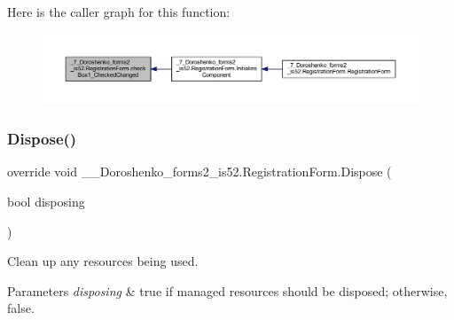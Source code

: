 Here is the caller graph for this function\+:
\nopagebreak
\begin{figure}[H]
\begin{center}
\leavevmode
\includegraphics[width=350pt]{class__7___doroshenko__forms2__is52_1_1_registration_form_ab5089f0bb46579d23942b19d4bbcd542_icgraph}
\end{center}
\end{figure}
\hypertarget{class__7___doroshenko__forms2__is52_1_1_registration_form_a9d9116080a88f2a3a51d7a0ee3c08d69}{}\label{class__7___doroshenko__forms2__is52_1_1_registration_form_a9d9116080a88f2a3a51d7a0ee3c08d69} 
\subsubsection{\texorpdfstring{Dispose()}{Dispose()}}
{\footnotesize\ttfamily override void \+\_\+\_\+\+Doroshenko\+\_\+forms2\+\_\+is52.\+Registration\+Form.\+Dispose (\begin{DoxyParamCaption}\item[{bool}]{disposing }\end{DoxyParamCaption})\hspace{0.3cm}{\ttfamily [protected]}}



Clean up any resources being used. 


\begin{DoxyParams}{Parameters}
{\em disposing} & true if managed resources should be disposed; otherwise, false.\\
\hline
\end{DoxyParams}
\hypertarget{class__7___doroshenko__forms2__is52_1_1_registration_form_a0fe750fb526e69ebe4b83165857d91bf}{}\label{class__7___doroshenko__forms2__is52_1_1_registration_form_a0fe750fb526e69ebe4b83165857d91bf} 
